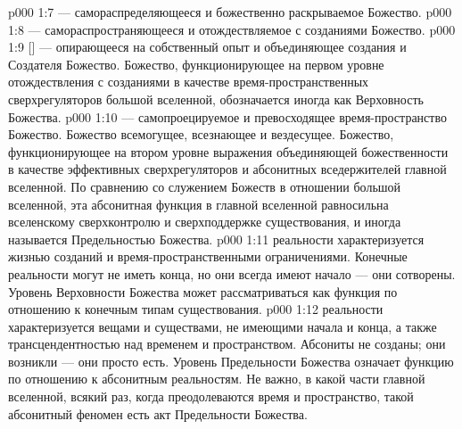\vs p000 1:7  --- самораспределяющееся и божественно раскрываемое Божество.
\vs p000 1:8  --- самораспространяющееся и отождествляемое с созданиями Божество.
\vs p000 1:9  [] --- опирающееся на собственный опыт и объединяющее создания и Создателя Божество. Божество, функционирующее на первом уровне отождествления с созданиями в качестве время\hyp{}пространственных сверхрегуляторов большой вселенной, обозначается иногда как Верховность Божества.
\vs p000 1:10   --- самопроецируемое и превосходящее время\hyp{}пространство Божество. Божество всемогущее, всезнающее и вездесущее. Божество, функционирующее на втором уровне выражения объединяющей божественности в качестве эффективных сверхрегуляторов и абсонитных вседержителей главной вселенной. По сравнению со служением Божеств в отношении большой вселенной, эта абсонитная функция в главной вселенной равносильна вселенскому сверхконтролю и сверхподдержке существования, и иногда называется Предельностью Божества.
\vs p000 1:11 \pc {} реальности характеризуется жизнью созданий и время\hyp{}пространственными ограничениями. Конечные реальности могут не иметь конца, но они всегда имеют начало --- они сотворены. Уровень Верховности Божества может рассматриваться как функция по отношению к конечным типам существования.
\vs p000 1:12 \pc {}  реальности характеризуется вещами и существами, не имеющими начала и конца, а также трансцендентностью над временем и пространством. Абсониты не созданы; они возникли --- они просто есть. Уровень Предельности Божества означает функцию по отношению к абсонитным реальностям. Не важно, в какой части главной вселенной, всякий раз, когда преодолеваются время и пространство, такой абсонитный феномен есть акт Предельности Божества.
